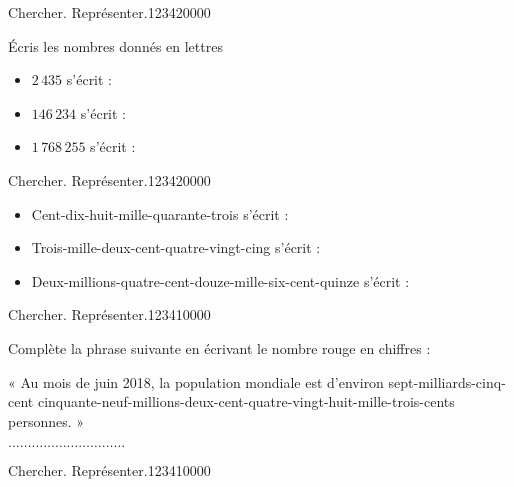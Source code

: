 \begin{pageAD} 



\begin{ExoCad}{Chercher. Représenter.}{1234}{2}{0}{0}{0}{0}

Écris les nombres donnés en lettres 

\begin{itemize}[leftmargin=*]
\item $2\,435$ s'écrit : 
\item $146\,234$ s'écrit :  
\item $1\,768\,255$ s'écrit : 
\end{itemize}

\end{ExoCad}
 
 
 \begin{ExoCad}{Chercher. Représenter.}{1234}{2}{0}{0}{0}{0}
 \begin{itemize}[leftmargin=*]
\item Cent-dix-huit-mille-quarante-trois s'écrit : 
\item Trois-mille-deux-cent-quatre-vingt-cing s'écrit :  
\item Deux-millions-quatre-cent-douze-mille-six-cent-quinze s'écrit : 
\end{itemize}
  \end{ExoCad}
  
 \begin{ExoCad}{Chercher. Représenter.}{1234}{1}{0}{0}{0}{0}
 
Complète la phrase suivante en écrivant le nombre rouge en chiffres :

« Au mois de juin 2018, la population mondiale est d’environ {\color{sacado_red}sept-milliards-cinq-cent
cinquante-neuf-millions-deux-cent-quatre-vingt-huit-mille-trois-cents}  personnes. »

$\ldots\ldots\ldots\ldots\ldots\ldots\ldots\ldots\ldots\ldots$
  \end{ExoCad} 
  
  
 
  
\begin{ExoCad}{Chercher. Représenter.}{1234}{1}{0}{0}{0}{0}
 

\end{ExoCad}
\end{pageAD}
